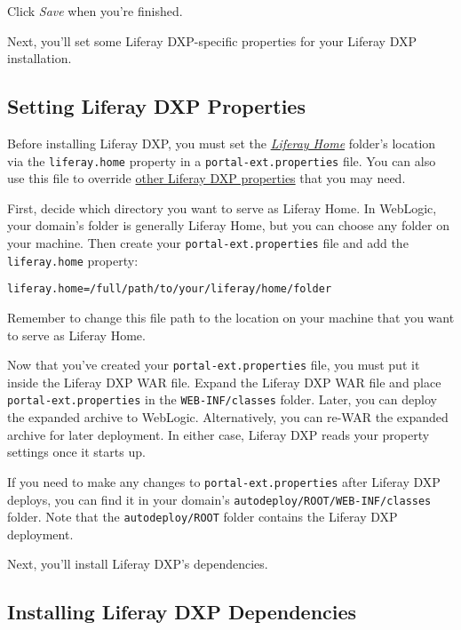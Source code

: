 Click \emph{Save} when you're finished.

Next, you'll set some Liferay DXP-specific properties for your Liferay DXP
installation.

\subsection{Setting Liferay DXP
Properties}\label{setting-liferay-dxp-properties}

Before installing Liferay DXP, you must set the
\href{/docs/7-0/deploy/-/knowledge_base/d/installing-product\#liferay-home}{\emph{Liferay
Home}} folder's location via the \texttt{liferay.home} property in a
\texttt{portal-ext.properties} file. You can also use this file to
override
\href{@platform-ref@/7.0-latest/propertiesdoc/portal.properties.html}{other
Liferay DXP properties} that you may need.

First, decide which directory you want to serve as Liferay Home. In
WebLogic, your domain's folder is generally Liferay Home, but you can
choose any folder on your machine. Then create your
\texttt{portal-ext.properties} file and add the \texttt{liferay.home}
property:

\begin{verbatim}
liferay.home=/full/path/to/your/liferay/home/folder
\end{verbatim}

Remember to change this file path to the location on your machine that
you want to serve as Liferay Home.

Now that you've created your \texttt{portal-ext.properties} file, you
must put it inside the Liferay DXP WAR file. Expand the Liferay DXP WAR
file and place \texttt{portal-ext.properties} in the
\texttt{WEB-INF/classes} folder. Later, you can deploy the expanded
archive to WebLogic. Alternatively, you can re-WAR the expanded archive
for later deployment. In either case, Liferay DXP reads your property
settings once it starts up.

If you need to make any changes to \texttt{portal-ext.properties} after
Liferay DXP deploys, you can find it in your domain's
\texttt{autodeploy/ROOT/WEB-INF/classes} folder. Note that the
\texttt{autodeploy/ROOT} folder contains the Liferay DXP deployment.

Next, you'll install Liferay DXP's dependencies.

\subsection{Installing Liferay DXP
Dependencies}\label{installing-liferay-dxp-dependencies-4}

